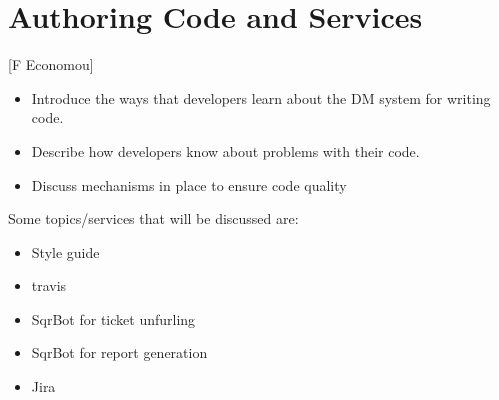 \section{Authoring Code and Services} [F Economou]
\begin{itemize}
\item Introduce the ways that developers learn about the DM system for writing code.
\item Describe how developers know about problems with their code.
\item Discuss mechanisms in place to ensure code quality
\end{itemize}

Some topics/services that will be discussed are:
\begin{itemize}
\item Style guide
\item travis
\item SqrBot for ticket unfurling
\item SqrBot for report generation
\item Jira
\end{itemize}
